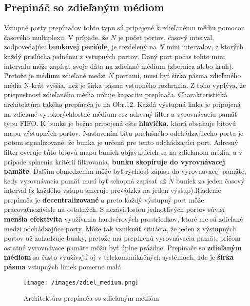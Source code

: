 \subsection{Prepináč so zdieľaným médiom}
Vstupné porty prepínačov tohto typu sú pripojené k zdieľanému médiu pomocou
časového multiplexu. V prípade, že $N$ je počet portov, časový interval, zodpovedajúci \textbf{bunkovej perióde}, je rozdelený na $N$ mini intervalov, z ktorých každý prislúcha jednému z vstupných portov. Daný port počas tohto mini intervalu môže zapísať svoje dáta na zdieľané médium (zbernica alebo kruh). Pretože je médium zdieľané medzi $N$ portami, musí byť šírka pásma zdieľaného média N-krát vyššia, než je šírka pásma vstupného rozhrania. Z toho vyplýva, že priepustnosť zdieľaného média určuje kapacitu prepínača. Charakteristická architektúra takého prepínača je na Obr.12. Každá výstupná linka je pripojená na zdieľané vysokorýchlostné médium cez adresný filter a vyrovnávaciu pamäť typu FIFO. K bunke je bežne pripojená ešte \textbf{hlavička}, ktorá obsahuje
bitovú mapu výstupných portov. Nastavením bitu príslušného odchádzajúceho portu je potom signalizované, že bunka je určená pre tento odchádzajúci port. Adresný filter overuje túto bitovú mapu buniek objavujúcich sa na zdieľanom médiu, a v prípade splnenia kritérií filtrovania, \textbf{bunku skopíruje do vyrovnávacej pamäte}. \newline
Ďalším obmedzením môže byť rýchlosť zápisu do vyrovnávacej pamäte, kedy vyrovnávacia pamäť musí byť schopná zapísať až $N$ buniek za jeden časový interval (z každého vstupu smeruje prevádzka na jeden výstup).Riadenie prepínača je \textbf{decentralizované} a preto každý výstupný port môže pracovaťnezávisle na ostatných. S nezávislosťou jednotlivých portov súvisí \textbf{menšia efektivita} využívania hardvérových prostriedkov, ktoré nie sú zdieľané medzi odchádzajúce porty. Môže tak vzniknúť situácia, že jeden z výstupných portov už zahadzuje bunky, pretože má preplnenú vyrovnávaciu pamäť, pričom ostatné vyrovnávace pamäte môžu byť úplne prázdne. Prepínače so \textbf{zdieľaným médiom} sa často využívajú aj v telekomunikačných systémoch, kde je \textbf{šírka pásma} vstupných liniek pomerne {malá}.

\begin{figure}[ht]
\centering
  \begin{center}
    \texttt{[image: /images/zdiel\_medium.png]}
  \end{center}
  \caption[Architektúra prepínača so zdieľaným médióm]{Architektúra prepínača so zdieľaným médióm}
\end{figure}

